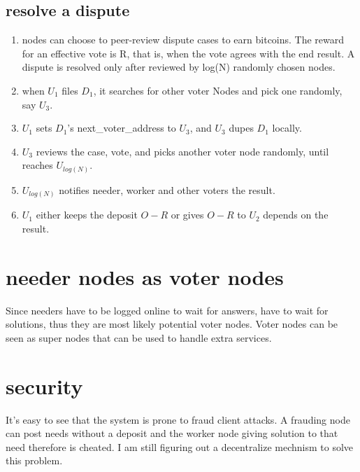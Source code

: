 \documentclass[12pt]{article}
\begin{document}
\subsection{resolve a dispute}
\begin{enumerate}
	\item nodes can choose to peer-review dispute cases to earn bitcoins. The reward for an effective vote is R, that is, when the vote agrees with the end result. A dispute is resolved only after reviewed by log(N) randomly chosen nodes.
	\item when $U_1$ files $D_1$, it searches for other voter Nodes and pick one randomly, say $U_3$. 
	\item $U_1$ sets $D_1$'s next\_voter\_address to $U_3$, and $U_3$ dupes $D_1$ locally. 
	\item $U_3$ reviews the case, vote, and picks another voter node randomly, until reaches $U_{log(N)}$.
	\item $U_{log(N)}$ notifies needer, worker and other voters the result.
	\item $U_1$ either keeps the deposit $O-R$ or gives $O-R$ to $U_2$ depends on the result.
\end{enumerate}

\section{needer nodes as voter nodes}
Since needers have to be logged online to wait for answers, have to wait for solutions, thus they are most likely potential voter nodes. Voter nodes can be seen as super nodes that can be used to handle extra services.

\section{security}
It's easy to see that the system is prone to fraud client attacks. A frauding node can post needs without a deposit and the worker node giving solution to that need therefore is cheated. I am still figuring out a decentralize mechnism to solve this problem.

\begin{thebibliography}{9}
\end{thebibliography}

	
\end{document}
